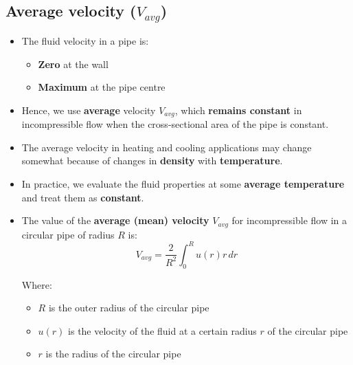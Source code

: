 \documentclass[11pt]{article}
\begin{document}
\subsection{Average velocity (\(V_{avg}\))}
\label{sec:org9835bb1}
\begin{itemize}
\item The fluid velocity in a pipe is:
\begin{itemize}
\item \textbf{Zero} at the wall
\item \textbf{Maximum} at the pipe centre
\end{itemize}
\item Hence, we use \textbf{average} velocity \(V_{avg}\), which \textbf{remains constant} in incompressible flow when the cross-sectional area of the pipe is constant.
\item The average velocity in heating and cooling applications may change somewhat because of changes in \textbf{density} with \textbf{temperature}.
\item In practice, we evaluate the fluid properties at some \textbf{average temperature} and treat them as \textbf{constant}.
\item The value of the \textbf{average (mean) velocity} \(V_{avg}\) for incompressible flow in a circular pipe of radius \(R\) is:
\[V_{avg} = \frac{2}{R^2} \int_0^R u(r) r \, dr\]

Where:
\begin{itemize}
\item \(R\) is the outer radius of the circular pipe
\item \(u(r)\) is the velocity of the fluid at a certain radius \(r\) of the circular pipe
\item \(r\) is the radius of the circular pipe
\end{itemize}
\end{itemize}
\end{document}
